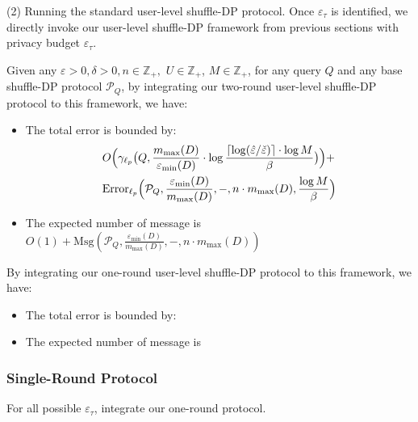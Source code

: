 (2) Running the standard user-level shuffle-DP protocol. Once $\varepsilon_\tau$ is identified, we directly invoke our user-level shuffle-DP framework from previous sections with privacy budget $\varepsilon_\tau$.


\begin{theorem}
    Given any $\varepsilon > 0, \delta >0, n \in \mathbb{Z}_+, $ $U \in \mathbb{Z}_{+}$, $M \in \mathbb{Z}_{+}$, for any query $Q$ and any base shuffle-DP protocol $\mathcal{P}_Q$, by integrating our two-round user-level shuffle-DP protocol to this framework, we have:
    \begin{itemize}
        \item The total error is bounded by:
        \[
            \begin{aligned}
            &O\Big(\gamma_{\ell_p}\big(Q,\frac{ m_{\max}(D)}{\varepsilon_{\min}(D)}\cdot \log \frac{\lceil\log(\hat{\varepsilon}/\check{\varepsilon})\rceil\cdot\log M}{\beta}  \big)\Big)
            +   \\
            &
            \mathrm{Error}_{\ell_p}\Big(\mathcal{P}_Q, \frac{\varepsilon_{\min}(D)}{m_{\max}(D)},-, n \cdot m_{\max}(D),\frac{\log M}{\beta}\Big)
            \end{aligned}
        \]
        \item The expected number of message is $O(1)+\text{Msg}(\mathcal{P}_Q,\frac{\varepsilon_{\min}(D)}{m_{\max}(D)},-,n\cdot m_{\max}(D))$
    \end{itemize}

By integrating our one-round user-level shuffle-DP protocol to this framework, we have:

\begin{itemize}
    \item The total error is bounded by:

    \item The expected number of message is 
\end{itemize}
\end{theorem}


\subsubsection{Single-Round Protocol}
For all possible $\varepsilon_\tau$, integrate our one-round protocol.



